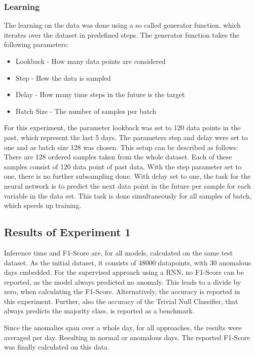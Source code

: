 \subsubsection{Learning}
The learning on the data was done using a so called generator function, which iterates over the dataset in predefined steps. The generator function takes the following parameters:

\begin{itemize}
	\item Lookback - How many data points are considered
	\item Step - How the data is sampled
	\item Delay - How many time steps in the future is the target
	\item Batch Size - The number of samples per batch
\end{itemize}

For this experiment, the parameter lookback was set to 120 data points in the past, which represent the last 5 days. The parameters step and delay were set to one and as batch size 128 was chosen. This setup can be described as follows: There are 128 ordered samples taken from the whole dataset. Each of these samples consist of 120 data point of past data. With the step parameter set to one, there is no further subsampling done. With delay set to one, the task for the neural network is to predict the next data point in the future per sample for each variable in the data set. This task is done simultaneously for all samples of batch, which speeds up training.

\subsection{Results of Experiment 1}

Inference time and F1-Score are, for all models, calculated on the same test dataset. As the initial dataset, it consists of 48000 datapoints, with 30 anomalous days embedded. For the supervised approach using a RNN, no F1-Score can be reported, as the model always predicted no anomaly. This leads to a divide by zero, when calculating the F1-Score. Alternatively, the accuracy is reported in this experiment. Further, also the accuracy of the Trivial Null Classifier, that always predicts the majority class, is reported as a benchmark.

Since the anomalies span over a whole day, for all approaches, the results were averaged per day. Resulting in normal or anomalous days. The reported F1-Score was finally calculated on this data. 


